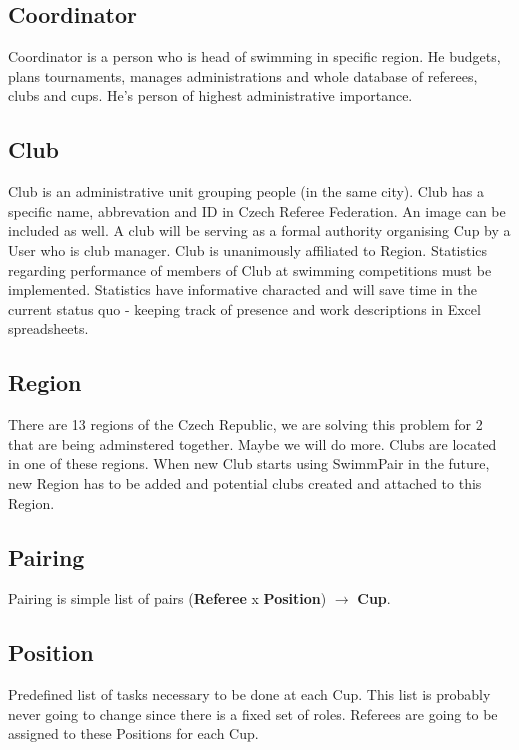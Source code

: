 \subsection*{Coordinator}
Coordinator is a person who is head of swimming in specific region. He budgets, plans tournaments, manages administrations and whole database of referees, clubs and cups. He's person of highest administrative importance.
\subsection*{Club}
\par
Club is an administrative unit grouping people (in the same city). Club has a specific name, abbrevation and ID in Czech Referee Federation. An image can be included as well. A club will be serving as a formal authority organising Cup by a User who is club manager. Club is unanimously affiliated to Region. Statistics regarding performance of members of Club at swimming competitions must be implemented. Statistics have informative characted and will save time in the current status quo - keeping track of presence and work descriptions in Excel spreadsheets.
\subsection*{Region}
There are 13 regions of the Czech Republic, we are solving this problem for 2 that are being adminstered together. Maybe we will do more. Clubs are located in one of these regions. When new Club starts using SwimmPair in the future, new Region has to be added and potential clubs created and attached to this Region. 

\subsection*{Pairing}
Pairing is simple list of pairs (\textbf{Referee} x \textbf{Position}) $\rightarrow$ \textbf{Cup}.
\subsection*{Position}
Predefined list of tasks necessary to be done at each Cup. This list is probably never going to change since there is a fixed set of roles. Referees are going to be assigned to these Positions for each Cup.
\newpage
